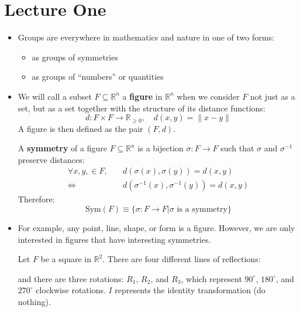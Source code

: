 \section{Lecture One}
\begin{itemize}
    \item Groups are everywhere in mathematics and nature in one of two forms:
    \begin{itemize}
        \item as groups of symmetries
        \item as groups of ``numbers'' or quantities
    \end{itemize}
    \item We will call a subset $F \subseteq \mathbb{R}^n$ a \textbf{figure} in $\mathbb{R}^n$ when we consider $F$ not just as a set, but as a set together with the structure of its distance functions:
    \begin{equation}
        d: F \times F \rightarrow \mathbb{R}_{\ge 0},\quad d(x,y) = \lVert x-y \rVert
    \end{equation}
    A figure is then defined as the pair $(F,d)$.
    \begin{definition}
        A \textbf{symmetry} of a figure $F \subseteq \mathbb{R}^n$ is a bijection $\sigma: F \rightarrow F$ such that $\sigma$ and $\sigma^{-1}$ preserve distances:
        \begin{align}
            \forall x,y, \in F,\quad& d(\sigma(x),\sigma(y))=d(x,y) \\ 
            \iff & d(\sigma^{-1}(x), \sigma^{-1}(y)) = d(x,y)
        \end{align}
        Therefore:
        \begin{equation}
            \text{Sym}(F) \equiv \{\sigma: F\to F | \sigma\text{ is a symmetry}\}
        \end{equation}
    \end{definition}
    \item For example, any point, line, shape, or form is a figure. However, we are only interested in figures that have interesting symmetries.
    \begin{example}
        Let $F$ be a square in $\mathbb{R}^2$. There are four different lines of reflections:
        \begin{center}
        \end{center}
        and there are three rotations: $R_1$, $R_2$, and $R_3$, which represent $90^\circ$, $180^\circ$, and $270^\circ$ clockwise rotations. $I$ represents the identity transformation (do nothing).
        \vspace{2mm}


\end{example}
\end{itemize}
